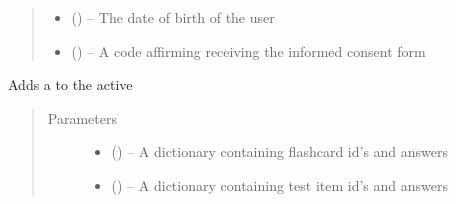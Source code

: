 \documentclass[letterpaper,10pt,english]{sphinxmanual}
\begin{document}
\begin{fulllineitems}
\begin{fulllineitems}
\begin{quote}
\begin{description}
\begin{itemize}
\item {} 
 (\href{https://docs.python.org/2/library/datetime.html\#module-datetime}{}) -- The date of birth of the user

\item {} 
 (\href{https://docs.python.org/2/library/functions.html\#str}{}) -- A code affirming receiving the informed consent form

\end{itemize}

\end{description}\end{quote}

\end{fulllineitems}


\begin{fulllineitems}
\label{\detokenize{consumer:consumer.Consumer.add_test}}
Adds a {\hyperref[\detokenize{test:test.Test}]{}} to the active {\hyperref[\detokenize{user:user.User}]{}}
\begin{quote}\begin{description}
\item[{Parameters}] \leavevmode\begin{itemize}
\item {} 
 (\href{https://docs.python.org/2/library/stdtypes.html\#dict}{}\sphinxstyleliteralemphasis{(}\href{https://docs.python.org/2/library/functions.html\#str}{}\sphinxstyleliteralemphasis{, }\href{https://docs.python.org/2/library/functions.html\#str}{}\sphinxstyleliteralemphasis{)}\sphinxstyleliteralemphasis{}) -- A dictionary containing flashcard id's and answers

\item {} 
 (\href{https://docs.python.org/2/library/stdtypes.html\#dict}{}\sphinxstyleliteralemphasis{(}\href{https://docs.python.org/2/library/functions.html\#str}{}\sphinxstyleliteralemphasis{, }\href{https://docs.python.org/2/library/functions.html\#str}{}\sphinxstyleliteralemphasis{)}\sphinxstyleliteralemphasis{}) -- A dictionary containing test item id's and answers


\end{itemize}
\end{description}
\end{quote}
\end{fulllineitems}
\end{fulllineitems}
\end{document}
